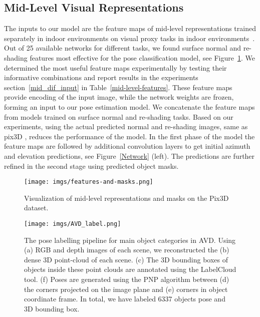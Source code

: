 \documentclass[letterpaper, 10 pt, conference]{ieeeconf}  \pdfoutput=1
\begin{document}
\subsection{Mid-Level Visual Representations}
\label{input}
The inputs to our model are the feature maps of mid-level representations trained separately
in indoor environments on visual proxy tasks in indoor environments~\cite{taskonomy2018}. Out of 25 available networks for different tasks, we found surface normal and re-shading features most effective for the pose classification model, see Figure~\ref{inputmodel}. We determined the most useful feature maps experimentally by testing their informative combinations and report results in the experiments section~\ref{mid_dif_input} in Table~\ref{mid-level-features}.  
These feature maps provide encoding of the input image, while the network weights are frozen, forming an input to our pose estimation model. We concatenate the  feature maps from models trained on surface normal and re-shading tasks. Based on our experiments, using the actual predicted normal and re-shading images, same as pix3D \cite{pix3d}, reduces the performance of the model.
In the first phase of the model the feature maps are followed by additional convolution layers
to get initial azimuth and elevation predictions, see Figure~\ref{Network} (left). The predictions are further refined in the second stage using predicted object masks.












\begin{figure}[htbp]
\begin{center}


  \texttt{[image: imgs/features-and-masks.png]}
\end{center}
   \caption{Visualization of mid-level representations and masks on the Pix3D dataset.}
\label{inputmodel}
\end{figure}
\begin{figure*}[htbp]
\begin{center}
\texttt{[image: imgs/AVD\_label.png]}
\end{center}
   \caption{The pose labelling pipeline for main object categories in AVD. Using (a) RGB and depth images of each scene, we reconstructed the (b) dense 3D point-cloud of each scene. (c) The 3D bounding boxes of objects inside these point clouds are annotated using the LabelCloud tool. (f) Poses are generated using the PNP algorithm between (d) the corners projected on the image plane and (e) corners in object coordinate frame. In total, we have labeled 6337 objects pose and 3D bounding box.}
\label{AVD_labeling_pipline}
\end{figure*} 
\end{document}
